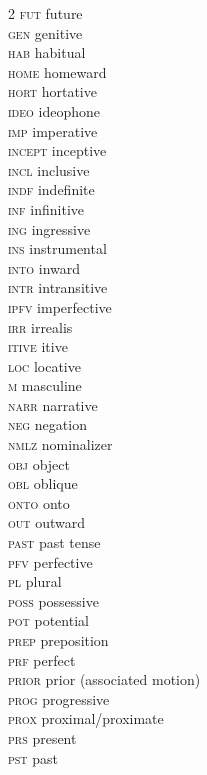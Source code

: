 \begin{multicols}{2}
\textsc{fut} future \\ 
\textsc{gen} genitive \\ 
\textsc{hab} habitual \\ 
\textsc{home} homeward \\ 
\textsc{hort} hortative \\ 
\textsc{ideo} ideophone \\ 
\textsc{imp} imperative \\ 
\textsc{incept} inceptive \\ 
\textsc{incl} inclusive \\ 
\textsc{indf} indefinite \\ 
\textsc{inf} infinitive \\ 
\textsc{ing} ingressive \\ 
\textsc{ins} instrumental \\ 
\textsc{into} inward \\ 
\textsc{intr} intransitive \\ 
\textsc{ipfv} imperfective \\ 
\textsc{irr} irrealis \\ 
\textsc{itive} itive \\ 
\textsc{loc} locative \\ 
\textsc{m} masculine \\ 
\textsc{narr} narrative \\ 
\textsc{neg} negation \\ 
\textsc{nmlz} nominalizer \\ 
\textsc{obj} object \\ 
\textsc{obl} oblique \\ 
\textsc{onto} onto \\ 
\textsc{out} outward \\ 
\textsc{past} past tense \\ 
\textsc{pfv} perfective \\ 
\textsc{pl} plural \\ 
\textsc{poss} possessive \\ 
\textsc{pot} potential \\ 
\textsc{prep} preposition \\ 
\textsc{prf} perfect \\ 
\textsc{prior} prior (associated motion) \\ 
\textsc{prog} progressive \\ 
\textsc{prox} proximal/proximate \\ 
\textsc{prs} present \\ 
\textsc{pst} past \\ 

\end{multicols}
